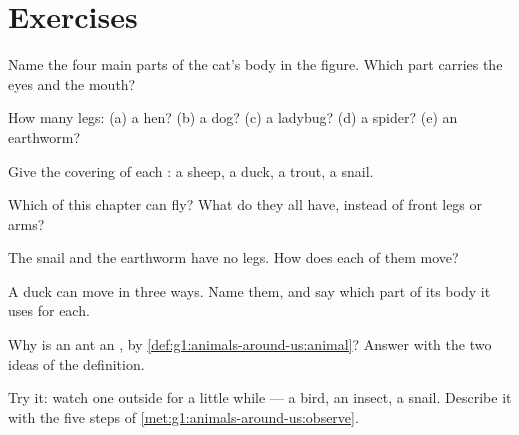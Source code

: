 \section{Exercises}

\begin{exercise}[$\star$]\label{exo:g1:animals-around-us:1}
Name the four main parts of the cat's body in the figure. Which
part carries the eyes and the mouth?
\end{exercise}

\begin{exercise}[$\star$]\label{exo:g1:animals-around-us:2}
How many legs: (a) a hen? (b) a dog? (c) a ladybug? (d) a spider?
(e) an earthworm?
\end{exercise}

\begin{exercise}[$\star$]\label{exo:g1:animals-around-us:3}
Give the covering of each : a sheep, a duck, a trout, a
snail.
\end{exercise}

\begin{exercise}[$\star$]\label{exo:g1:animals-around-us:4}
Which  of this chapter can fly? What do they all have,
instead of front legs or arms?
\end{exercise}

\begin{exercise}[$\star$]\label{exo:g1:animals-around-us:5}
The snail and the earthworm have no legs. How does each of them
move?
\end{exercise}

\begin{exercise}[$\star$]\label{exo:g1:animals-around-us:6}
A duck can move in three ways. Name them, and say which part of its
body it uses for each.
\end{exercise}

\begin{exercise}[$\star$]\label{exo:g1:animals-around-us:7}
Why is an ant an , by \cref{def:g1:animals-around-us:animal}?
Answer with the two ideas of the definition.
\end{exercise}

\begin{exercise}[$\star$]\label{exo:g1:animals-around-us:8}
Try it: watch one  outside for a little while --- a bird, an
insect, a snail. Describe it with the five steps of
\cref{met:g1:animals-around-us:observe}.
\end{exercise}


